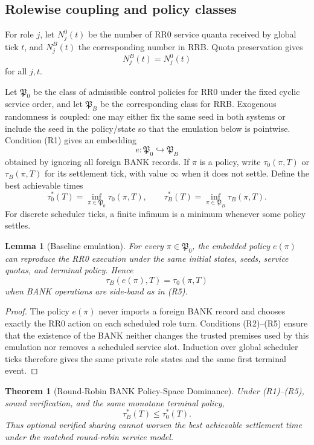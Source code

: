 \documentclass[11pt]{article}
\newtheorem{theorem}[definition]{Theorem}
\newtheorem{lemma}[definition]{Lemma}
\begin{document}
\subsection{Rolewise coupling and policy classes}

For role $j$, let $N_j^0(t)$ be the number of RR0 service quanta received by global tick $t$, and $N_j^B(t)$ the corresponding number in RRB. Quota preservation gives
\[
N_j^B(t)=N_j^0(t)
\]
for all $j,t$.

Let $\mathfrak P_0$ be the class of admissible control policies for RR0 under the fixed cyclic service order, and let $\mathfrak P_B$ be the corresponding class for RRB. Exogenous randomness is coupled: one may either fix the same seed in both systems or include the seed in the policy/state so that the emulation below is pointwise. Condition (R1) gives an embedding
\[
e:\mathfrak P_0\hookrightarrow\mathfrak P_B
\]
obtained by ignoring all foreign BANK records. If $\pi$ is a policy, write $\tau_0(\pi,T)$ or $\tau_B(\pi,T)$ for its settlement tick, with value $\infty$ when it does not settle. Define the best achievable times
\[
\tau_0^*(T)=\inf_{\pi\in\mathfrak P_0}\tau_0(\pi,T),
\qquad
\tau_B^*(T)=\inf_{\pi\in\mathfrak P_B}\tau_B(\pi,T).
\]
For discrete scheduler ticks, a finite infimum is a minimum whenever some policy settles.

\begin{lemma}[Baseline emulation]
For every $\pi\in\mathfrak P_0$, the embedded policy $e(\pi)$ can reproduce the RR0 execution under the same initial states, seeds, service quotas, and terminal policy. Hence
\[
\tau_B(e(\pi),T)=\tau_0(\pi,T)
\]
when BANK operations are side-band as in (R5).
\end{lemma}
\begin{proof}
The policy $e(\pi)$ never imports a foreign BANK record and chooses exactly the RR0 action on each scheduled role turn. Conditions (R2)--(R5) ensure that the existence of the BANK neither changes the trusted premises used by this emulation nor removes a scheduled service slot. Induction over global scheduler ticks therefore gives the same private role states and the same first terminal event.
\end{proof}

\begin{theorem}[Round-Robin BANK Policy-Space Dominance]
Under (R1)--(R5), sound verification, and the same monotone terminal policy,
\[
\boxed{\tau_B^*(T)\le \tau_0^*(T).}
\]
Thus optional verified sharing cannot worsen the \emph{best achievable} settlement time under the matched round-robin service model.
\end{theorem}
\end{document}
